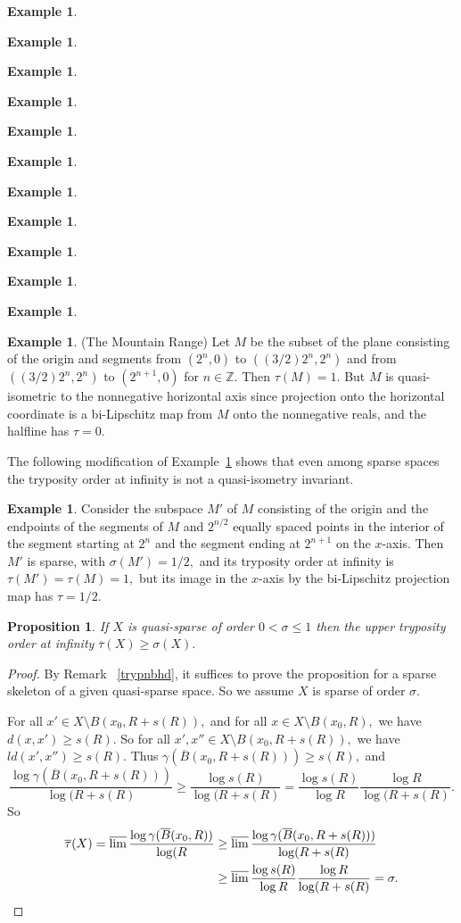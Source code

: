 \documentclass[12pt]{amsart}
\newtheorem{proposition}[theorem]{Proposition}
\theoremstyle{definition}
\newtheorem{example}[theorem]{Example}
\theoremstyle{remark}
\numberwithin{equation}{section}
\newcommand{\Z}{\mathbb{Z}}
\newcommand{\ut}{\overline{\tau}}
\newcommand{\oB}{\overline{B}}
\begin{document}
\begin{example}
\begin{example}
\begin{example}
\begin{example}
\begin{example}
\begin{example}
\begin{example}
\begin{example}
\begin{example}
\begin{example}
\begin{example}
\begin{example}\label{mountainrange}
(The Mountain Range) Let $M$ be the subset of the plane consisting of
  the origin and segments from $(2^n,0)$ to $((3/2) 2^n, 2^n)$ and
  from $((3/2)2^n,2^n)$ to $(2^{n+1},0)$ for $n \in \Z.$ Then
  $\tau(M)=1.$ But $M$ is quasi-isometric to the nonnegative
  horizontal axis since projection onto the horizontal coordinate is a
  bi-Lipschitz map from $M$ onto the nonnegative reals, and the
  halfline has $\tau = 0.$
\end{example}

The following modification of Example~\ref{mountainrange} shows that
even among sparse spaces the tryposity order at infinity is not a
quasi-isometry invariant.

\begin{example}\label{trypnotq-iinvar}
Consider the subspace $M'$ of $M$ consisting of the origin and the
endpoints of the segments of $M$ and $2^{n/2}$ equally spaced points
in the interior of the segment starting at $2^n$ and the segment
ending at $2^{n+1}$ on the $x$-axis. Then $M'$ is sparse, with
$\sigma(M')=1/2,$ and its tryposity order at infinity is
$\tau(M')=\tau(M)=1,$ but its image in the $x$-axis by the
bi-Lipschitz projection map has $\tau = 1/2.$
\end{example}

\begin{proposition}\label{tryp/sparsity}
If $X$ is quasi-sparse of order $0 < \sigma \leq 1$ then the upper
tryposity order at infinity $\ut(X) \geq \sigma(X).$
\end{proposition}

\begin{proof}
By Remark ~\ref{trypnbhd}, it suffices to prove the proposition for a
sparse skeleton of a given quasi-sparse space. So we assume $X$ is
sparse of order $\sigma.$

For all $x' \in X \setminus B(x_0,R+s(R)),$ and for all $x \in X
\setminus B(x_0,R),$ we have $d(x,x') \geq s(R).$ So for all $x',x''
\in X \setminus B(x_0,R+s(R)),$ we have $ld(x',x'') \geq s(R).$ Thus
$\gamma(\oB(x_0,R+s(R))) \geq s(R),$ and
\begin{equation*}
\frac{\log{\gamma(\oB(x_0,R+s(R)))}}{\log(R+s(R)} \geq \frac{\log
  s(R)}{\log(R+s(R)} = \frac{\log s(R)}{\log R}  \frac{\log
  R}{\log(R+s(R)}.
\end{equation*}
So
\begin{equation*}
\begin{split}
\ut(X) = \varlimsup \frac{\log{\gamma(\oB(x_0,R))}}{\log(R} &\geq
\varlimsup \frac{\log{\gamma(\oB(x_0,R+s(R)))}}{\log(R+s(R)} \\ &\geq
\varlimsup \frac{\log s(R)}{\log R} \frac{\log R}{\log (R+s(R)} =
\sigma.
\end{split}
\end{equation*}
\end{proof}


\end{example}
\end{example}
\end{example}
\end{example}
\end{example}
\end{example}
\end{example}
\end{example}
\end{example}
\end{example}
\end{example}
\end{document}
